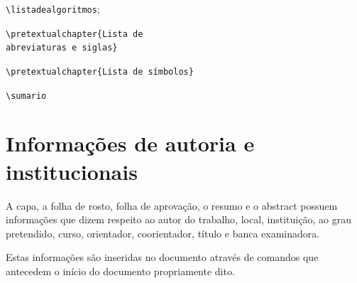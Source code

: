 \documentclass[a4paper,12pt,oneside,onecolumn,final,fleqn]{repUERJ}
\begin{document}
\begin{itemizacao}
	\texttt{\textbackslash listadealgoritmos};
\item {} 
		\parbox[t][35pt][t]{\textwidth-8cm}{
        	\texttt{\textbackslash pretextualchapter\{Lista de}\\
            \texttt{abreviaturas e siglas\}}}
\item {} 
	\texttt{\textbackslash pretextualchapter\{Lista de símbolos\}}
\item {} 
	\texttt{\textbackslash sumario}
\end{itemizacao}

\section{Informações de autoria e institucionais}

A capa, a folha de rosto, folha de aprovação, o resumo e o abstract possuem informações que dizem respeito ao autor do trabalho, local, instituição, ao grau pretendido, curso, orientador, coorientador, título e banca examinadora.

Estas informações são inseridas no documento através de comandos que antecedem o início do documento propriamente dito.
\end{document}

